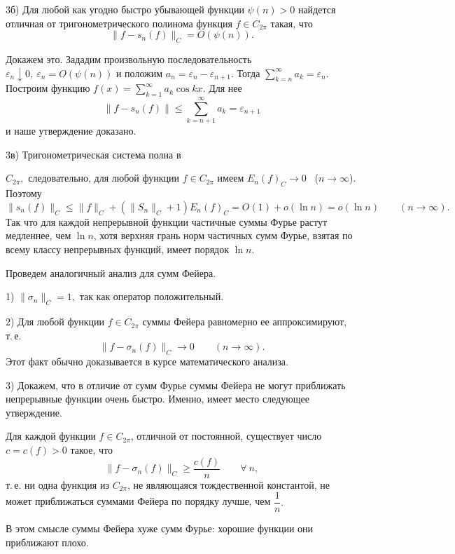 3б) Для любой как угодно быстро убывающей функции $\psi(n)>0$
найдется отличная от тригонометрического полинома функция
$f\in C_{2\pi}$ такая, что
$$
\|f-s_n(f)\|_C=O(\psi(n)).
$$

Докажем это. Зададим произвольную последовательность $\varepsilon_n \downarrow 0,\
\varepsilon_n=O(\psi(n))$ и положим
$a_n=\varepsilon_n-\varepsilon_{n+1}$. Тогда
$\sum\limits_{k=n}^{\infty} a_k=\varepsilon_n$. Построим функцию $f(x)=\sum\limits_{k=1}^{\infty}
a_k \cos kx.$ Для нее
$$
\|f-s_n(f)\|\le \sum\limits_{k=n+1}^{\infty} a_k = \varepsilon_{n+1}
$$
и наше утверждение доказано.




3в) Тригонометрическая система полна в {$C_{2\pi},$ следовательно, для любой функции
$f\in C_{2\pi}$ имеем $E_n(f)_C\to 0$~ ($n\to
\infty$). Поэтому
$$
\|s_n(f)\|_C\le \|f\|_C+(\|{S_n}\|_C+1) E_n(f)_C=O(1)+o(\ln n)=o(\ln n)\qquad (n\to \infty).
$$
Так что для каждой непрерывной функции частичные суммы Фурье растут медленнее,
чем $\ln n$, хотя верхняя грань норм частичных сумм Фурье, взятая
по всему классу непрерывных функций, имеет порядок $\ln n$.

Проведем аналогичный анализ для сумм Фейера.

1) $\|\sigma_n\|_C=1,$ так как оператор положительный.

2) Для любой функции $f\in C_{2\pi}$ суммы Фейера равномерно ее
аппроксимируют, т.\,е.
$$
\|f-\sigma_n(f)\|_C\to 0\qquad (n\to \infty).
$$
Этот факт обычно доказывается в курсе математического анализа.

3) Докажем, что в отличие от сумм Фурье суммы Фейера не могут
приближать непрерывные функции очень быстро.
Именно, имеет место следующее утверждение.

\begin{teo}
Для каждой функции $f\in C_{2\pi}$, отличной от постоянной, существует число
$c=c(f)>0$
такое, что
$$
\|f-\sigma_n(f)\|_C\ge \frac{c(f)}{n}\qquad \forall\ n,
$$
т.\,е. ни одна функция из $C_{2\pi}$, не являющаяся тождественной константой,
не может приближаться суммами Фейера по порядку лучше, чем $\dfrac{1}{n}.$
\end{teo}

В этом смысле суммы Фейера хуже сумм Фурье: хорошие функции они приближают
плохо.

}
